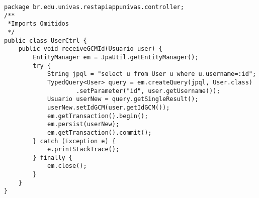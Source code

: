 \begin{lstlisting}[style=custom_JAVA]
package br.edu.univas.restapiappunivas.controller;
/**
 *Imports Omitidos
 */
public class UserCtrl {
	public void receiveGCMId(Usuario user) {
		EntityManager em = JpaUtil.getEntityManager();		
		try {
			String jpql = "select u from User u where u.username=:id";
			TypedQuery<User> query = em.createQuery(jpql, User.class)
					.setParameter("id", user.getUsername());
			Usuario userNew = query.getSingleResult();
			userNew.setIdGCM(user.getIdGCM());
			em.getTransaction().begin();
			em.persist(userNew);
			em.getTransaction().commit();
		} catch (Exception e) {
			e.printStackTrace();
		} finally {
			em.close();
		}
	}
}
\end{lstlisting}



